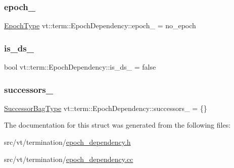 \subsubsection{\texorpdfstring{epoch\+\_\+}{epoch\_}}
{\footnotesize\ttfamily \hyperlink{namespacevt_a81d11b28122d43bf9834577e4a06440f}{Epoch\+Type} vt\+::term\+::\+Epoch\+Dependency\+::epoch\+\_\+ = no\+\_\+epoch\hspace{0.3cm}{\ttfamily [protected]}}

\mbox{\label{structvt_1_1term_1_1_epoch_dependency_af0e5729c264094d1bbc132f429a1219b}} 
\subsubsection{\texorpdfstring{is\+\_\+ds\+\_\+}{is\_ds\_}}
{\footnotesize\ttfamily bool vt\+::term\+::\+Epoch\+Dependency\+::is\+\_\+ds\+\_\+ = false\hspace{0.3cm}{\ttfamily [private]}}

\mbox{\label{structvt_1_1term_1_1_epoch_dependency_ac9061b05e0c17f67b01754c4c1599770}} 
\subsubsection{\texorpdfstring{successors\+\_\+}{successors\_}}
{\footnotesize\ttfamily \hyperlink{structvt_1_1term_1_1_epoch_dependency_a3f00b47c33158f3241ebbeb0a0cb7b1d}{Successor\+Bag\+Type} vt\+::term\+::\+Epoch\+Dependency\+::successors\+\_\+ = \{\}\hspace{0.3cm}{\ttfamily [private]}}



The documentation for this struct was generated from the following files\+:\begin{DoxyCompactItemize}
\item 
src/vt/termination/\hyperlink{epoch__dependency_8h}{epoch\+\_\+dependency.\+h}\item 
src/vt/termination/\hyperlink{epoch__dependency_8cc}{epoch\+\_\+dependency.\+cc}\end{DoxyCompactItemize}
